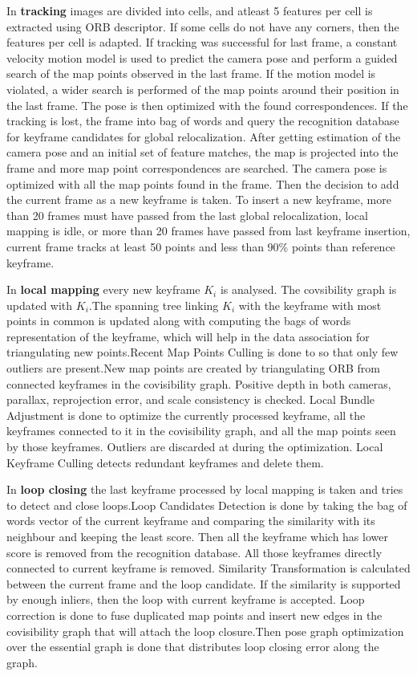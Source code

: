 In \textbf{tracking} images are divided into cells, and atleast 5 features per cell is extracted using ORB descriptor. If some cells do not have any corners, then the features per cell is adapted. If tracking was successful for last frame, a constant velocity motion model is used to predict the camera pose and perform a guided search of the map points observed in the last frame. If the motion model is violated, a wider search is performed of the map points around their position in the last frame. The pose is then optimized with the found correspondences. If the tracking is lost, the frame into bag of words and query the recognition database for keyframe candidates for global relocalization. After getting estimation of the camera pose and an initial set of feature matches, the map is projected into the frame and more map point correspondences are searched. The camera pose is optimized with all the map points found in the frame. Then the decision to add the current frame as a new keyframe is taken. To insert a new keyframe, more than 20 frames must have passed from the last global relocalization, local mapping is idle, or more than 20 frames have passed from last keyframe insertion, current frame tracks at least 50 points and less than 90\% points than reference keyframe.

In \textbf{local mapping} every new keyframe $K_i$ is analysed. The covsibility graph is updated with $K_i$.The spanning tree linking $K_i$ with the keyframe with most points in common is updated along with computing the bags of words representation of the keyframe, which will help in the data association for triangulating new points.Recent Map Points Culling is done to so that only few outliers are present.New map points are created by triangulating ORB from connected keyframes in the covisibility graph. Positive depth in both cameras, parallax, reprojection error, and scale consistency is checked. Local Bundle Adjustment is done to optimize the currently processed keyframe, all the keyframes connected to it in the covisibility graph, and all the map points seen by those keyframes. Outliers are discarded at during the optimization. Local Keyframe Culling detects redundant keyframes and delete them.

In \textbf{loop closing}  the last keyframe processed by local mapping is taken and tries to detect and close loops.Loop Candidates Detection is done by taking the bag of words vector of the current keyframe and comparing the similarity with its neighbour and keeping the least score. Then all the keyframe which has lower score is removed from the recognition database. All those keyframes directly connected to current keyframe is removed. Similarity Transformation is calculated between the current frame and the loop candidate. If the similarity is supported by enough inliers, then the loop with current keyframe is accepted. Loop correction is done to fuse duplicated map points and insert new edges in the covisibility graph that will attach the loop closure.Then pose graph optimization over the essential graph is done that distributes loop closing error along the graph. 


